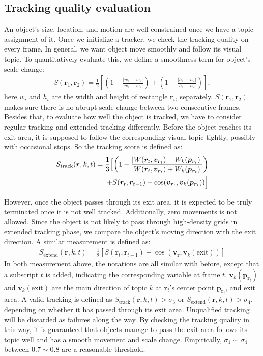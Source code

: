 \subsection{Tracking quality evaluation}
\label{sec:track_eval}
An object's size, location, and motion are well constrained once we have a topic assignment of it. 
Once we initialize a tracker, we check the tracking quality on every frame. In general, we want object move smoothly and follow its visual topic. To quantitatively evaluate this, we define a smoothness term for object's scale change:
\begin{align}
    S(\bm{r}_1, \bm{r}_2) = \frac{1}{2}\left[\left(1-\frac{|w_1- w_2|}{w_1 + w_2}\right) + \left(1-\frac{|h_1 - h_2|}{h_1 + h_2}\right)\right], 
\end{align}
here $w_i$ and $h_i$ are the width and height of rectangle $\bm{r}_{i}$, separately. $S(\bm{r}_1, \bm{r}_2)$ makes sure there is no abrupt scale change between two consecutive frames.
Besides that, to evaluate how well the object is tracked, we have to consider regular tracking and extended tracking differently. 
Before the object reaches its exit area, it is supposed to follow the corresponding visual topic tightly, possibly with occasional stops. So the tracking score is defined as:
\begin{align}
\begin{split}
    S_{\text{track}}(\bm{r}, k, t) = \frac{1}{3}\Bigl[\left(1 - \frac{|W(\bm{r}_t, \bm{v}_{\bm{r}_t}) - W_k(\bm{p}_{\bm{r}_t})|}{W(\bm{r}_t, \bm{v}_{\bm{r}_t}) + W_k(\bm{p}_{\bm{r}_t})}\right) \\
    + S(\bm{r}_t, \bm{r}_{t-1}) + \cos(\bm{v}_{\bm{r}_t}, \bm{v}_k(\bm{p}_{\bm{r}_t}))\Bigl]
\end{split}
\label{eq:track_score}
\end{align}

However, once the object passes through its exit area, it is expected to be truly terminated once it is not well tracked. 
Additionally, zero movements is not allowed. Since the object is not likely to pass through high-density grids in extended tracking phase, we compare the object's moving direction with the exit direction. A similar measurement is defined as:
\begin{align}
    S_{\text{extend}}(\bm{r}, k, t) = \frac{1}{2}\left[S(\bm{r}_t, \bm{r}_{t-1}) + \cos(\bm{v_r}, \bm{v}_k(\text{exit}))\right]\label{eq:track_ext_score}
\end{align}
In both measurement above, the notations are all similar with before, except that a subscript $t$ is added, indicating the corresponding variable at frame $t$. 
$\bm{v}_k(\bm{p}_{\bm{r}_t})$ and $\bm{v}_k(\text{exit})$ are the main direction of topic $k$ at $\bm{r}_{t}$'s center point $\bm{p}_{\bm{r}_t}$, and exit area.
A valid tracking is defined as $S_{\text{track}}(\bm{r}, k, t)>\sigma_{3}$ or $S_{\text{extend}}(\bm{r}, k, t)>\sigma_{4}$, depending on whether it has passed through its exit area. Unqualified tracking will be discarded as failures along the way.
By checking the tracking quality in this way, it is guaranteed that objects manage to pass the exit area follows its topic well and has a smooth movement and scale change. 
Empirically, $\sigma_1\sim\sigma_{4}$ between $0.7\sim0.8$ are a reasonable threshold.

